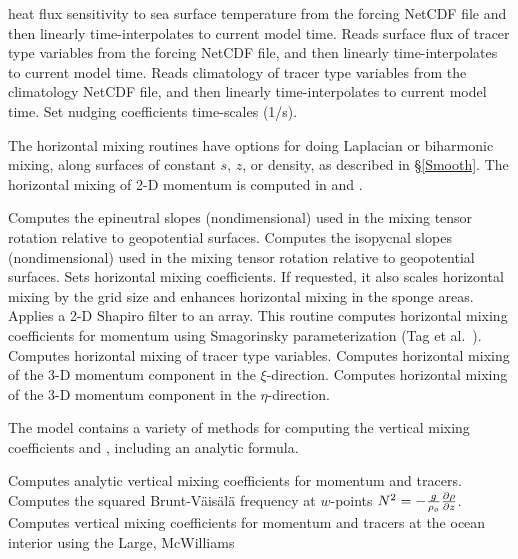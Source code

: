 \begin{klist}
\begin{klist}
   heat flux sensitivity to sea surface temperature from the forcing
   NetCDF file and then linearly time-interpolates to current model
   time.
       Reads surface flux of tracer type variables
   from the forcing NetCDF file, and then linearly
   time-interpolates to current model time.
       Reads climatology of tracer type variables
   from the climatology NetCDF file, and then linearly
   time-interpolates to current model time.
      Set nudging coefficients time-scales (1/s).
   \end{klist}
 The horizontal mixing routines have options
for doing Laplacian or biharmonic mixing, along surfaces of constant
$s$, $z$, or density, as described in \S\ref{Smooth}.
The horizontal mixing of 2-D momentum is computed in  and
.
   \begin{klist}
      Computes the epineutral slopes
   (nondimensional) used in the mixing tensor rotation relative
   to geopotential surfaces.
      Computes the isopycnal slopes
   (nondimensional) used in the mixing tensor rotation relative
   to geopotential surfaces.
      Sets horizontal mixing coefficients.  If
   requested, it also scales horizontal mixing by the grid size and
   enhances horizontal mixing in the sponge areas.
        Applies a 2-D Shapiro filter to an array.
      This routine computes horizontal mixing
   coefficients for momentum using Smagorinsky parameterization (Tag et
   al.\ \cite{Tag79}).
       Computes horizontal mixing of tracer type
   variables.
       Computes horizontal mixing of the 3-D momentum
   component in the $\xi$-direction.
       Computes horizontal mixing of the 3-D momentum
   component in the $\eta$-direction.
   \end{klist}
 The model contains a variety of methods for
computing the vertical mixing coefficients  and ,
including an analytic formula.
   \begin{klist}
      Computes analytic vertical mixing coefficients
   for momentum and tracers.
       Computes the squared Brunt-V\"ais\"al\"a
   frequency at $w$-points $N^2 = - {g \over \rho_o} {\partial \rho
   \over \partial z}$.
      Computes vertical mixing coefficients for
   momentum 
   and tracers at the ocean interior using the  Large,  McWilliams

\end{klist}
\end{klist}
